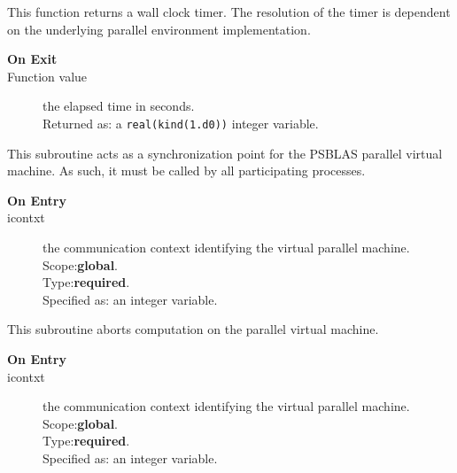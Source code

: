 

This function returns a wall clock timer. The resolution of the timer
is dependent on the underlying parallel environment implementation.
\begin{description}
\item[\bf  On Exit ]
\item[Function value] the elapsed time in seconds.\\
Returned  as: a  \verb|real(kind(1.d0))|  integer variable.
\end{description}




This subroutine acts as a synchronization point for  the  PSBLAS
parallel virtual  machine. As such, it must be called by all
participating processes. 
\begin{description}
\item[\bf  On Entry ]
\item[icontxt] the communication context identifying the virtual
  parallel machine.\\
Scope:{\bf global}.\\
Type:{\bf required}.\\
Specified as: an integer variable.
\end{description}




This subroutine aborts computation on the parallel virtual machine. 
\begin{description}
\item[\bf  On Entry ]
\item[icontxt] the communication context identifying the virtual
  parallel machine.\\
Scope:{\bf global}.\\
Type:{\bf required}.\\
Specified as: an integer variable.
\end{description}



%
%


